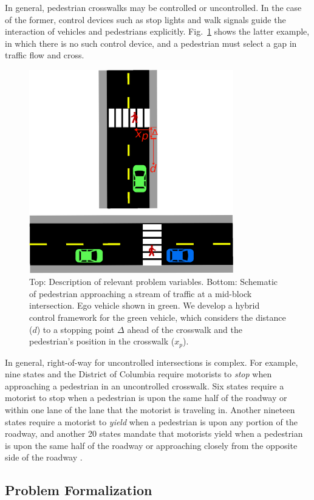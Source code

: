 \documentclass[letterpaper, 10 pt, conference]{ieeeconf}  %
\begin{document}
In general, pedestrian crosswalks may be controlled or uncontrolled. In the case of the former, control devices such as stop lights and walk signals guide the interaction of vehicles and pedestrians explicitly. Fig.~\ref{fig:schematic} shows the latter example, in which there is no such control device, and a pedestrian must select a gap in traffic flow and cross.   

\begin{figure}
\centering
\includegraphics[width=3.5in]{figures/example2.eps}
\caption{Top: Description of relevant problem variables. Bottom: Schematic of pedestrian approaching a stream of traffic at a mid-block intersection. Ego vehicle shown in green. We develop a hybrid control framework for the green vehicle, which considers the distance ($d$) to a stopping point $\Delta$ ahead of the crosswalk and the pedestrian's position in the crosswalk ($x_p$).}
\label{fig:schematic}
\end{figure}

In general, right-of-way for uncontrolled intersections is complex. For example, nine states and the District of Columbia require motorists to \textit{stop} when approaching a pedestrian in an uncontrolled crosswalk. Six states require a motorist to stop when a pedestrian is upon the same half of the roadway or within one lane of the lane that the motorist is traveling in. Another nineteen states require a motorist to \textit{yield} when a pedestrian is upon any portion of the roadway, and another 20 states mandate that motorists yield when a pedestrian is upon the same half of the roadway or approaching closely from the opposite side of the roadway \cite{Legislatures2018}.

\subsection{Problem Formalization}
\label{sec:probform}
\end{document}
